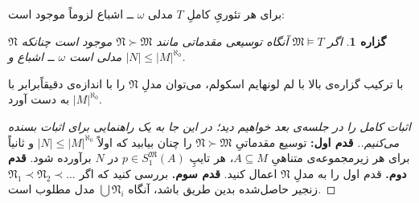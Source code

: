 \documentclass[12pt,a4paper]{article}
\theoremstyle{colorhead}
\newtheorem{prop}[thm]{گزاره}
\begin{document}
برای هر تئوریِ کاملِ
$T$
مدلی 
$\omega$ 
ــ
اشباع لزوماً موجود است:
\begin{prop}
\label{vojudeakande}
اگر
$\mathfrak{M}\models T$
آنگاه توسیعی مقدماتی مانند
$\mathfrak{N}\succ \mathfrak{M}$
موجود است چنانکه 
$\mathfrak{N}$
مدلی است
$\omega$ ــ
اشباع و 
$|N|\leq |M|^{\aleph_0}$.
\end{prop}
با ترکیب گزاره‌ی بالا با لم لونهایم اسکولم، می‌توان مدلِ
$\mathfrak{N}$
را با اندازه‌ی دقیقاً‌برابر با
$|M|^{\aleph_0}$
به دست آورد.
\begin{proof}[اثبات کامل را در جلسه‌ی بعد خواهیم دید؛ در این جا به یک راهنمایی برای اثبات بسنده می‌کنیم.]
\hfill \newline
\textbf{قدم اول:}
توسیع مقدماتیِ
$\mathfrak{N}\succ \mathfrak{M}$
را چنان بیابید که
اولاً
$|N|\leq |M|^{\aleph_0}$
و ثانیاً برای هر زیرمجموعه‌ی متناهیِ
$A\subseteq M$،
هر تایپِ
$p\in S_1^\mathfrak{M}(A)$
در
$N$
برآورده شود. 
\newline
\textbf{قدم دوم.}
قدم اول را به مدلِ
$\mathfrak{N}$
اعمال کنید.
\newline
\textbf{قدم سوم.}
بررسی کنید که
اگر
$\mathfrak{N}_1\prec \mathfrak{N}_2\prec \ldots$
زنجیر حاصل‌شده بدین طریق باشد، آنگاه
$\bigcup \mathfrak{N}_i$
مدل مطلوب است. 
\end{proof}
\pagebreak
\end{document}
